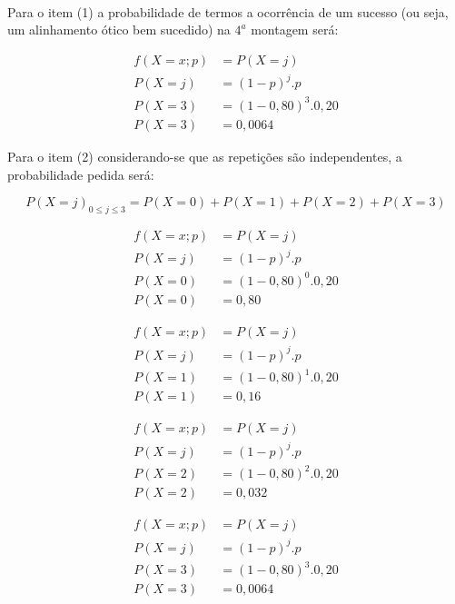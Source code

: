 \documentclass[
]{book}
\begin{document}
~

Para o item (1) a probabilidade de termos a ocorrência de um sucesso (ou seja, um alinhamento ótico bem sucedido) na \(4^{a}\) montagem será:

\hfill\break

\begin{align*}
f(X=x; p) & = P(X=j) \\
P(X=j)  & = (1-p)^{j} . p \\
P(X=3) & = (1-0,80)^{3} . 0,20 \\
P(X=3) & = 0,0064
\end{align*}

\hfill\break

Para o item (2) considerando-se que as repetições são independentes, a probabilidade pedida será:

\hfill\break

\[
P(X=j)_{0 \leq j \leq 3} = P(X=0) + P(X=1) + P(X=2) + P(X=3)
\]

\hfill\break

\begin{align*}
f(X=x; p) & = P(X=j) \\
P(X=j) & =  (1-p)^{j} . p \\
P(X=0) & =  (1-0,80)^{0} . 0,20 \\
P(X=0) &  =  0,80 
\end{align*}

\hfill\break

\begin{align*}
f(X=x; p) & =  P(X=j) \\
P(X=j) & =  (1-p)^{j} . p \\
P(X=1) & =  (1-0,80)^{1} . 0,20 \\
P(X=1) & = 0,16
\end{align*}

\hfill\break

\begin{align*}
f(X=x; p) & =   P(X=j) \\
P(X=j) & =  (1-p)^{j} . p \\
P(X=2) & =  (1-0,80)^{2} . 0,20 \\
P(X=2) & = 0,032
\end{align*}

\hfill\break

\begin{align*}
f(X=x; p) & =  P(X=j) \\
 P(X=j) & =  (1-p)^{j} . p \\
P(X=3) & =  (1-0,80)^{3} . 0,20 \\
P(X=3) & = 0,0064
\end{align*}
\end{document}
